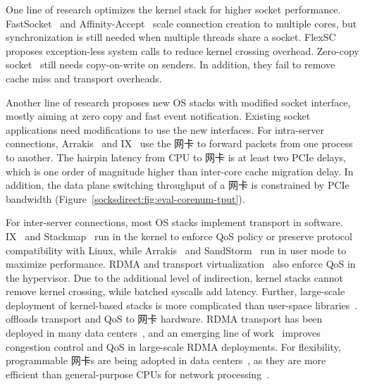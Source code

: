 


\iffalse
{}
One line of research optimizes the kernel stack for higher socket performance. FastSocket~\cite{lin2016scalable} and Affinity-Accept~\cite{pesterev2012improving} scale connection creation to multiple cores, but synchronization is still needed when multiple threads share a socket.
FlexSC~\cite{soares2010flexsc} proposes exception-less system calls to reduce kernel crossing overhead.
Zero-copy socket~\cite{thadani1995efficient,chu1996zero} still needs copy-on-write on senders.
In addition, they fail to remove cache miss and transport overheads.


Another line of research proposes new OS stacks with modified socket interface, mostly aiming at zero copy and fast event notification. Existing socket applications need modifications to use the new interfaces.
For intra-server connections, Arrakis~\cite{peter2016arrakis} and IX~\cite{belay2017ix} use the 网卡 to forward packets from one process to another. The hairpin latency from CPU to 网卡 is at least two PCIe delays, which is one order of magnitude higher than inter-core cache migration delay. In addition, the data plane switching throughput of a 网卡 is constrained by PCIe bandwidth (Figure~\ref{socksdirect:fig:eval-corenum-tput}).

For inter-server connections, most OS stacks implement transport in software. IX~\cite{belay2017ix} and Stackmap~\cite{yasukata2016stackmap} run in the kernel to enforce QoS policy or preserve protocol compatibility with Linux, while Arrakis~\cite{peter2016arrakis} and SandStorm~\cite{marinos2014network} run in user mode to maximize performance.
RDMA and transport virtualization~\cite{tsai2017lite,niu2017network} also enforce QoS in the hypervisor.
Due to the additional level of indirection, kernel stacks cannot remove kernel crossing, while batched syscalls add latency.
Further, large-scale deployment of kernel-based stacks is more complicated than user-space libraries~\cite{andromeda}.
\sys offloads transport and QoS to 网卡 hardware.
RDMA transport has been deployed in many data centers~\cite{guo2016rdma}, and an emerging line of work~\cite{zhu2015congestion,lu2017memory,mprdma} improves congestion control and QoS in large-scale RDMA deployments.
For flexibility, programmable 网卡s are being adopted in data centers~\cite{smartnic,cavium}, as they are more efficient than general-purpose CPUs for network processing~\cite{kaufmann2015flexnic,li2016clicknp}.



